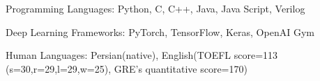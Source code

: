 

\begin{cventries}

\vspace{5mm}

  \begin{cvitems} %
    \item {Programming Languages: Python, C, C++, Java, Java Script, Verilog}
    \item {Deep Learning Frameworks: PyTorch, TensorFlow, Keras, OpenAI Gym}
    \item {Human Languages: Persian(native), English(TOEFL score=113 (s=30,r=29,l=29,w=25), GRE's quantitative score=170)}
   \end{cvitems}
\end{cventries}
